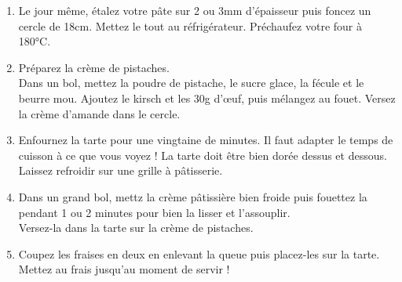 {\begin{enumerate}
Versez la crème pâtissière dans un plat puis couvrez d'un film étirable directement au contact. Laissez refroidir complètement puis placez au réfrigérateur pour 3 heures ou pour une nuit entière.
\item Le jour même, étalez votre pâte sur 2 ou 3mm d'épaisseur puis foncez un cercle de 18cm. Mettez le tout au réfrigérateur. Préchaufez votre four à 180°C.
\item Préparez la crème de pistaches. \\
Dans un bol, mettez la poudre de pistache, le sucre glace, la fécule et le beurre mou. Ajoutez le kirsch et les 30g d'\oe uf, puis mélangez au fouet. Versez la crème d'amande dans le cercle.
\item Enfournez la tarte pour une vingtaine de minutes. Il faut adapter le temps de cuisson à ce que vous voyez ! La tarte doit être bien dorée dessus et dessous. Laissez refroidir sur une grille à pâtisserie.
\item Dans un grand bol, mettz la crème pâtissière bien froide puis fouettez la pendant 1 ou 2 minutes pour bien la lisser et l'assouplir.\\
Versez-la dans la tarte sur la crème de pistaches.
\item Coupez les fraises en deux en enlevant la queue puis placez-les sur la tarte. Mettez au frais jusqu'au moment de servir !
\end{enumerate}}


